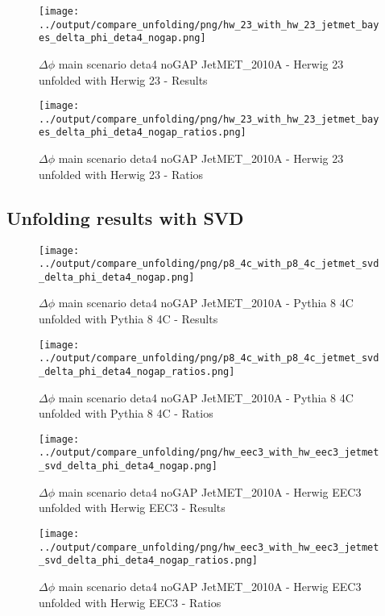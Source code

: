 \documentclass[11pt]{book}
\begin{document}
\begin{figure}[ht]
\centering
\texttt{[image: ../output/compare\_unfolding/png/hw\_23\_with\_hw\_23\_jetmet\_bayes\_delta\_phi\_deta4\_nogap.png]}
\caption{$\Delta\phi$ main scenario deta4 noGAP JetMET\_2010A - Herwig 23 unfolded with Herwig 23 - Results}
\label{hw_23_hw_23_jetmet_bayes_delta_phi_deta4_nogap_a}
\end{figure}

\begin{figure}[ht]
\centering
\texttt{[image: ../output/compare\_unfolding/png/hw\_23\_with\_hw\_23\_jetmet\_bayes\_delta\_phi\_deta4\_nogap\_ratios.png]}
\caption{$\Delta\phi$ main scenario deta4 noGAP JetMET\_2010A - Herwig 23 unfolded with Herwig 23 - Ratios}
\label{hw_23_hw_23_jetmet_bayes_delta_phi_deta4_nogap_b}
\end{figure}


\clearpage
\subsection{Unfolding results with SVD}

\begin{figure}[ht]
\centering
\texttt{[image: ../output/compare\_unfolding/png/p8\_4c\_with\_p8\_4c\_jetmet\_svd\_delta\_phi\_deta4\_nogap.png]}
\caption{$\Delta\phi$ main scenario deta4 noGAP JetMET\_2010A - Pythia 8 4C unfolded with Pythia 8 4C - Results}
\label{p8_p8_jetmet_svd_delta_phi_deta4_nogap_a}
\end{figure}

\begin{figure}[ht]
\centering
\texttt{[image: ../output/compare\_unfolding/png/p8\_4c\_with\_p8\_4c\_jetmet\_svd\_delta\_phi\_deta4\_nogap\_ratios.png]}
\caption{$\Delta\phi$ main scenario deta4 noGAP JetMET\_2010A - Pythia 8 4C unfolded with Pythia 8 4C - Ratios}
\label{p8_p8_jetmet_svd_delta_phi_deta4_nogap_b}
\end{figure}

\begin{figure}[ht]
\centering
\texttt{[image: ../output/compare\_unfolding/png/hw\_eec3\_with\_hw\_eec3\_jetmet\_svd\_delta\_phi\_deta4\_nogap.png]}
\caption{$\Delta\phi$ main scenario deta4 noGAP JetMET\_2010A - Herwig EEC3 unfolded with Herwig EEC3 - Results}
\label{hw_eec3_hw_eec3_jetmet_svd_delta_phi_deta4_nogap_a}
\end{figure}

\begin{figure}[ht]
\centering
\texttt{[image: ../output/compare\_unfolding/png/hw\_eec3\_with\_hw\_eec3\_jetmet\_svd\_delta\_phi\_deta4\_nogap\_ratios.png]}
\caption{$\Delta\phi$ main scenario deta4 noGAP JetMET\_2010A - Herwig EEC3 unfolded with Herwig EEC3 - Ratios}
\label{hw_eec3_hw_eec3_jetmet_svd_delta_phi_deta4_nogap_b}
\end{figure}
\end{document}
